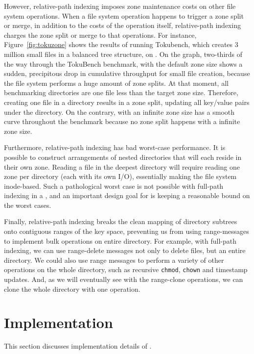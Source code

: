 However, relative-path indexing imposes zone maintenance costs on other file
system operations.
When a file system operation happens to trigger a zone split or merge,
in addition to the costs of the operation itself,
relative-path indexing charges the zone split or merge to that operations.
For instance, Figure~\ref{fig:tokuzone} shows the results of running Tokubench,
which creates 3 million small files in a balanced tree structure,
on \betrfsThree.
On the graph, two-thirds of the way through the TokuBench benchmark,
\betrfsThree with the default zone size shows a sudden,
precipitous drop in cumulative throughput for small file creation,
because the file system performs a huge amount of zone splits.
At that moment, all benchmarking directories are one file less than the target
zone size.
Therefore, creating one file in a directory results in a zone split,
updating all key/value pairs under the directory.
On the contrary, \betrfsThree with an infinite zone size
has a smooth curve throughout the benchmark
because no zone split happens with a infinite zone size.

Furthermore, relative-path indexing has bad worst-case performance.
It is possible to construct arrangements of nested directories that will each
reside in their own zone.
Reading a file in the deepest directory will require reading one zone per
directory (each with its own I/O),
essentially making the file system inode-based.
Such a pathological worst case is not possible with full-path indexing in a
\bet, and an important design goal for \betrfs is keeping a reasonable bound on
the worst cases.

Finally, relative-path indexing breaks the clean mapping of directory subtrees
onto contiguous ranges of the key space,
preventing us from using range-messages to implement bulk operations on entire
directory.
For example, with full-path indexing, we can use range-delete messages not
only to delete files, but an entire directory.
We could also use range messages to perform a variety of other operations on
the whole directory, such as recursive \texttt{chmod}, \texttt{chown} and
timestamp updates.
And, as we will eventually see with the range-clone operations, we can clone the
whole directory with one operation.

\section{Implementation}
\label{sec:bg:impl}

This section discusses implementation details of \fti.

